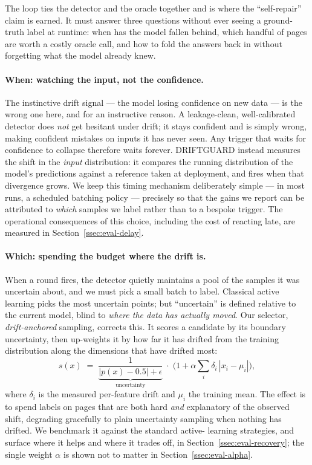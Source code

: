 The loop ties the detector and the oracle together and is where the
``self-repair'' claim is earned. It must answer three questions without ever
seeing a ground-truth label at runtime: when has the model fallen behind, which
handful of pages are worth a costly oracle call, and how to fold the answers
back in without forgetting what the model already knew.

\paragraph{When: watching the input, not the confidence.}
The instinctive drift signal --- the model losing confidence on new data --- is
the wrong one here, and for an instructive reason. A leakage-clean,
well-calibrated detector does \emph{not} get hesitant under drift; it stays
confident and is simply wrong, making confident mistakes on inputs it has never
seen. Any trigger that waits for confidence to collapse therefore waits
forever. DRIFTGUARD instead measures the shift in the \emph{input}
distribution: it compares the running distribution of the model's predictions
against a reference taken at deployment, and fires when that divergence grows.
We keep this timing mechanism deliberately simple --- in most runs, a scheduled
batching policy --- precisely so that the gains we report can be attributed to
\emph{which} samples we label rather than to a bespoke trigger. The operational
consequences of this choice, including the cost of reacting late, are measured
in Section~\ref{ssec:eval-delay}.

\paragraph{Which: spending the budget where the drift is.}
When a round fires, the detector quietly maintains a pool of the samples it was
uncertain about, and we must pick a small batch to label. Classical active
learning picks the most uncertain points; but ``uncertain'' is defined relative
to the current model, blind to \emph{where the data has actually moved}. Our
selector, \emph{drift-anchored} sampling, corrects this. It scores a candidate
by its boundary uncertainty, then up-weights it by how far it has drifted from
the training distribution along the dimensions that have drifted most:
\[
s(x) \;=\; \underbrace{\frac{1}{|p(x)-0.5|+\epsilon}}_{\text{uncertainty}}
\;\cdot\;
\Big(1 + \alpha \textstyle\sum_i \delta_i\,|x_i-\mu_i|\Big),
\]
where $\delta_i$ is the measured per-feature drift and $\mu_i$ the training
mean. The effect is to spend labels on pages that are both hard \emph{and}
explanatory of the observed shift, degrading gracefully to plain uncertainty
sampling when nothing has drifted. We benchmark it against the standard active-
learning strategies, and surface where it helps and where it trades off, in
Section~\ref{ssec:eval-recovery}; the single weight $\alpha$ is shown not to
matter in Section~\ref{ssec:eval-alpha}.

